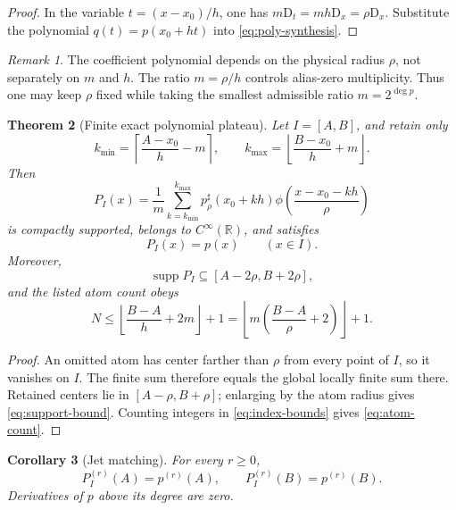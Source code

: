 \documentclass[11pt,oneside]{article}
\newtheorem{theorem}{Theorem}[section]
\newtheorem{corollary}[theorem]{Corollary}
\theoremstyle{definition}
\theoremstyle{remark}
\newtheorem{remark}[theorem]{Remark}
\newcommand{\R}{\mathbb R}
\newcommand{\supp}{\operatorname{supp}}
\newcommand{\D}{\mathrm D}
\newcommand{\floor}[1]{\left\lfloor #1\right\rfloor}
\newcommand{\ceil}[1]{\left\lceil #1\right\rceil}
\begin{document}
\begin{proof}
In the variable \(t=(x-x_0)/h\), one has
\(m\D_t=mh\D_x=\rho\D_x\).  Substitute the polynomial
\(q(t)=p(x_0+ht)\) into \eqref{eq:poly-synthesis}.
\end{proof}

\begin{remark}
The coefficient polynomial depends on the physical radius \(\rho\), not
separately on \(m\) and \(h\).  The ratio \(m=\rho/h\) controls alias-zero
multiplicity.  Thus one may keep \(\rho\) fixed while taking the smallest
admissible ratio \(m=2^{\deg p}\).
\end{remark}

\begin{theorem}[Finite exact polynomial plateau]
\label{thm:finite-plateau}
Let \(I=[A,B]\), and retain only
\begin{equation}
 k_{\min}=\ceil{\frac{A-x_0}{h}-m},\qquad
 k_{\max}=\floor{\frac{B-x_0}{h}+m}.
 \label{eq:index-bounds}
\end{equation}
Then
\begin{equation}
 P_I(x)=\frac1m\sum_{k=k_{\min}}^{k_{\max}}
 p_\rho^\sharp(x_0+kh)
 \phi\!\left(\frac{x-x_0-kh}{\rho}\right)
 \label{eq:finite-plateau}
\end{equation}
is compactly supported, belongs to \(C^\infty(\R)\), and satisfies
\[
 P_I(x)=p(x)\qquad(x\in I).
\]
Moreover,
\begin{equation}
 \supp P_I\subseteq[A-2\rho,B+2\rho],
 \label{eq:support-bound}
\end{equation}
and the listed atom count obeys
\begin{equation}
 N\le\floor{\frac{B-A}{h}+2m}+1
   =\floor{m\left(\frac{B-A}{\rho}+2\right)}+1.
 \label{eq:atom-count}
\end{equation}
\end{theorem}

\begin{proof}
An omitted atom has center farther than \(\rho\) from every point of \(I\), so
it vanishes on \(I\).  The finite sum therefore equals the global locally
finite sum there.  Retained centers lie in \([A-\rho,B+\rho]\); enlarging by
the atom radius gives \eqref{eq:support-bound}.  Counting integers in
\eqref{eq:index-bounds} gives \eqref{eq:atom-count}.
\end{proof}

\begin{corollary}[Jet matching]
\label{cor:jet-matching}
For every \(r\ge0\),
\[
 P_I^{(r)}(A)=p^{(r)}(A),\qquad
 P_I^{(r)}(B)=p^{(r)}(B).
\]
Derivatives of \(p\) above its degree are zero.
\end{corollary}
\end{document}
